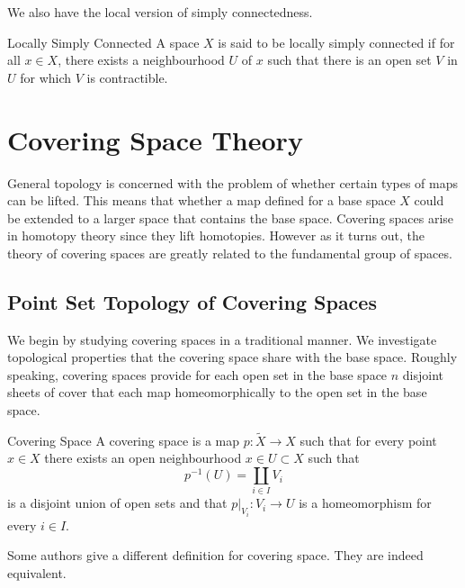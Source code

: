 \documentclass[a4paper]{article}
\begin{document}
We also have the local version of simply connectedness. 

\begin{defn}{Locally Simply Connected}{} A space $X$ is said to be locally simply connected if for all $x\in X$, there exists a neighbourhood $U$ of $x$ such that there is an open set $V$ in $U$ for which $V$ is contractible. 
\end{defn}

\pagebreak
\section{Covering Space Theory}
General topology is concerned with the problem of whether certain types of maps can be lifted. This means that whether a map defined for a base space $X$ could be extended to a larger space that contains the base space. Covering spaces arise in homotopy theory since they lift homotopies. However as it turns out, the theory of covering spaces are greatly related to the fundamental group of spaces. 

\subsection{Point Set Topology of Covering Spaces}
We begin by studying covering spaces in a traditional manner. We investigate topological properties that the covering space share with the base space. Roughly speaking, covering spaces provide for each open set in the base space $n$ disjoint sheets of cover that each map homeomorphically to the open set in the base space. 

\begin{defn}{Covering Space}{} A covering space is a map $p:\tilde{X}\to X$ such that for every point $x\in X$ there exists an open neighbourhood $x\in U\subset X$ such that $$p^{-1}(U)=\coprod_{i\in I}V_i$$ is a disjoint union of open sets and that $p|_{V_i}:V_i\to U$ is a homeomorphism for every $i\in I$. 
\end{defn}

Some authors give a different definition for covering space. They are indeed equivalent. 
\end{document}
